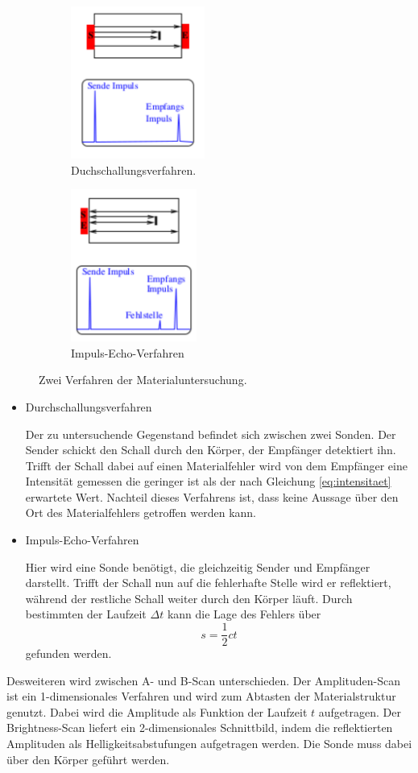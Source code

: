 \begin{figure}
\centering
\begin{subfigure}{0.48\textwidth}
\centering
\includegraphics[height=5cm]{Bilder/Durchschallung.pdf}
\caption{Duchschallungsverfahren.}
\label{fig:durchschallung}
\end{subfigure}
\begin{subfigure}{0.48\textwidth}
\centering
\includegraphics[height=5cm]{Bilder/Impuls-Echo.pdf}
\caption{Impuls-Echo-Verfahren}
\label{fig:impuls-echo}
\end{subfigure}
\caption{Zwei Verfahren der Materialuntersuchung.}%
\label{fig:verfahren}
\end{figure}
\begin{itemize}
\item Durchschallungsverfahren

Der zu untersuchende Gegenstand befindet sich zwischen zwei Sonden. Der Sender schickt den Schall durch den Körper, der Empfänger detektiert ihn. Trifft der Schall dabei auf einen Materialfehler wird von dem Empfänger eine Intensität gemessen die geringer ist als der nach Gleichung \eqref{eq:intensitaet} erwartete Wert. Nachteil dieses Verfahrens ist, dass keine Aussage über den Ort des Materialfehlers getroffen werden kann.
\item Impuls-Echo-Verfahren

Hier wird eine Sonde benötigt, die gleichzeitig Sender und Empfänger darstellt. Trifft der Schall nun auf die fehlerhafte Stelle wird er reflektiert, während der restliche Schall weiter durch den Körper läuft. Durch bestimmten der Laufzeit $\Delta{t}$ kann die Lage des Fehlers über
\begin{equation}
s=\frac{1}{2}ct
\label{eq:laufzeit}
\end{equation}
gefunden werden.
\end{itemize}
Desweiteren wird zwischen A- und B-Scan unterschieden. Der Amplituden-Scan ist ein 1-dimensionales Verfahren und wird zum Abtasten der Materialstruktur genutzt. Dabei wird die Amplitude als Funktion der Laufzeit $t$ aufgetragen. Der Brightness-Scan liefert ein 2-dimensionales Schnittbild, indem die reflektierten Amplituden als Helligkeitsabstufungen aufgetragen werden. Die Sonde muss dabei über den Körper geführt werden.
